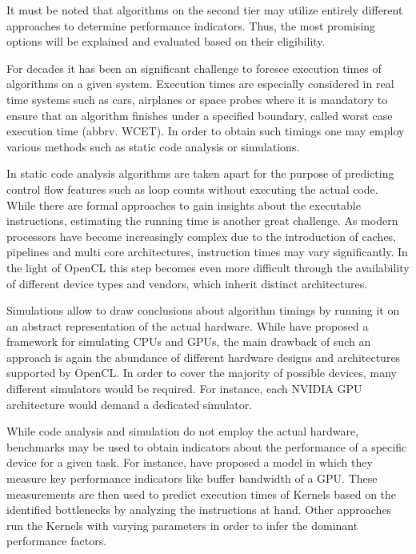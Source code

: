 It must be noted that algorithms on the second tier may utilize entirely different approaches to determine performance indicators. Thus, the most promising options will be explained and evaluated based on their eligibility.

For decades it has been an significant challenge to foresee execution times of algorithms on a given system. Execution times are especially considered in real time systems such as cars, airplanes or space probes where it is mandatory to ensure that an algorithm finishes under a specified boundary, called worst case execution time (abbrv. WCET). In order to obtain such timings one may employ various methods such as static code analysis or simulations\cite{wcet}.

In static code analysis algorithms are taken apart for the purpose of predicting control flow features such as loop counts without executing the actual code\cite{loopbound}\cite{sweet}. While there are formal approaches to gain insights about the executable instructions, estimating the running time is another great challenge. As modern processors have become increasingly complex due to the introduction of caches, pipelines and multi core architectures, instruction times may vary significantly\cite{wcet}. In the light of OpenCL this step becomes even more difficult through the availability of different device types and vendors, which inherit distinct architectures.

Simulations allow to draw conclusions about algorithm timings by running it on an abstract representation of the actual hardware\cite{wcet}. While \citeauthor{multi2sim} have proposed a framework for simulating CPUs and GPUs\cite{multi2sim}, the main drawback of such an approach is again the abundance of different hardware designs and architectures supported by OpenCL. In order to cover the majority of possible devices, many different simulators would be required. For instance, each NVIDIA GPU architecture would demand a dedicated simulator.

While code analysis and simulation do not employ the actual hardware, benchmarks may be used to obtain indicators about the performance of a specific device for a given task. For instance, \citeauthor{quantitative_performance} have proposed a model in which they measure key performance indicators like buffer bandwidth of a GPU\cite{quantitative_performance}. These measurements are then used to predict execution times of Kernels based on the identified bottlenecks by analyzing the instructions at hand. Other approaches run the Kernels with varying parameters in order to infer the dominant performance factors\cite{gpgpu_performance}.

